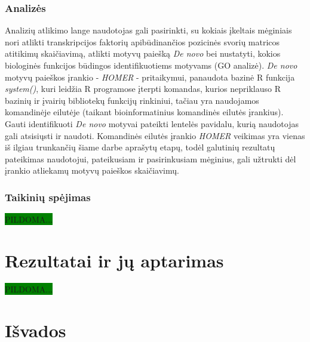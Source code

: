 \documentclass[12pt]{article}
\begin{document}
\subsubsection*{Analizės}
Analizių atlikimo lange naudotojas gali pasirinkti, su kokiais įkeltais
mėginiais nori atlikti transkripcijos faktorių apibūdinančios pozicinės
svorių matricos atitikimų skaičiavimą, atlikti motyvų paiešką \emph{De novo}
bei nustatyti, kokios biologinės funkcijos būdingos identifikuotiems motyvams
(GO analizė). \emph{De novo} motyvų paieškos įrankio - \emph{HOMER} -
pritaikymui, panaudota bazinė R funkcija \emph{system()}, kuri leidžia
R programose įterpti komandas, kurios nepriklauso R bazinių ir įvairių
bibliotekų funkcijų rinkiniui, tačiau yra naudojamos komandinėje eilutėje
(taikant bioinformatinius komandinės eilutės įrankius). Gauti identifikuoti
\emph{De novo} motyvai pateikti lentelės pavidalu, kurią naudotojas gali
atsisiųsti ir naudoti. Komandinės eilutės įrankio \emph{HOMER} veikimas yra
vienas iš ilgiau trunkančių šiame darbe aprašytų etapų, todėl galutinių
rezultatų pateikimas naudotojui, pateikusiam ir pasirinkusiam mėginius, gali
užtrukti dėl įrankio atliekamų motyvų paieškos skaičiavimų. 

\subsubsection*{Taikinių spėjimas}
\colorbox{green}{PILDOMA...}

\newpage


\section{Rezultatai ir jų aptarimas}
\colorbox{green}{PILDOMA...}

\newpage


\section{Išvados}
\newpage

\end{document}
